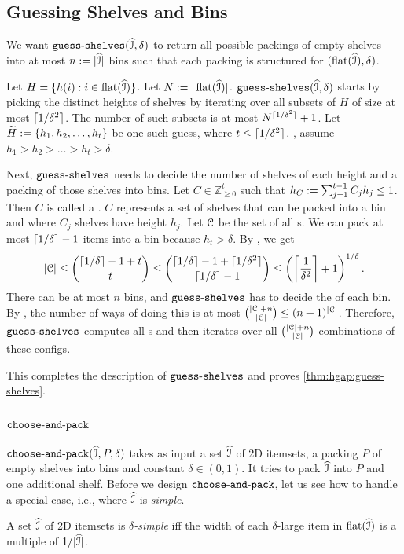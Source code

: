 \subsection{Guessing Shelves and Bins}
\label{sec:hgap:guess-shelves}

We want $\operatorname{\mathtt{guess-shelves}}(\widehat{\mathcal{I}}, \delta)$ to return all possible packings
of empty shelves into at most $n := |\widehat{\mathcal{I}}|$ bins such that
each packing is structured for $(\operatorname{flat}(\widehat{\mathcal{I}}), \delta)$.

Let $H = \{h(i): i \in \operatorname{flat}(\widehat{\mathcal{I}})\}$. Let $N := |\operatorname{flat}(\widehat{\mathcal{I}})|$.
$\operatorname{\mathtt{guess-shelves}}(\widehat{\mathcal{I}}, \delta)$ starts by picking the distinct heights of shelves
by iterating over all subsets of $H$ of size at most $\lceil 1/\delta^2 \rceil$.
The number of such subsets is at most $N^{\lceil 1/\delta^2 \rceil}+1$.
Let $\widetilde{H} := \{h_1, h_2, \ldots, h_t\}$ be one such guess, where $t \le \lceil 1/\delta^2 \rceil$.
\WLoG, assume $h_1 > h_2 > \ldots > h_t > \delta$.

Next, $\operatorname{\mathtt{guess-shelves}}$ needs to decide the number of shelves of each height
and a packing of those shelves into bins.
Let $C \in \mathbb{Z}_{\ge 0}^t$ such that $h_C := \sum_{j=1}^{t-1} C_jh_j \le 1$.
Then $C$ is called a \config{}.
$C$ represents a set of shelves that can be packed into a bin
and where $C_j$ shelves have height $h_j$.
Let $\mathcal{C}$ be the set of all \config{}s.
We can pack at most $\left\lceil 1/\delta \right\rceil-1$ items into a bin because $h_t > \delta$.
By , we get
\[ |\mathcal{C}| \le \binom{\left\lceil 1/\delta \right\rceil-1+t}{t}
\le \binom{\left\lceil 1/\delta \right\rceil-1+\lceil 1/\delta^2 \rceil}{\left\lceil 1/\delta \right\rceil-1}
\le \left(\left\lceil \frac{1}{\delta^2} \right\rceil+1\right)^{1/\delta}. \]
There can be at most $n$ bins, and $\operatorname{\mathtt{guess-shelves}}$ has to decide the \config{} of each bin.
By ,
the number of ways of doing this is at most
$\binom{|\mathcal{C}|+n}{|\mathcal{C}|} \le (n+1)^{|\mathcal{C}|}$.
Therefore, $\operatorname{\mathtt{guess-shelves}}$ computes all \config{}s and then
iterates over all $\binom{|\mathcal{C}|+n}{|\mathcal{C}|}$ combinations of these configs.

This completes the description of $\operatorname{\mathtt{guess-shelves}}$ and proves
\cref{thm:hgap:guess-shelves}.

\subsection{\texorpdfstring{$\operatorname{\mathtt{choose-and-pack}}$}{choose-and-pack}}
\label{sec:hgap:choose-and-pack}

$\operatorname{\mathtt{choose-and-pack}}(\widehat{\mathcal{I}}, P, \delta)$ takes as input a set $\widehat{\mathcal{I}}$ of 2D itemsets,
a packing $P$ of empty shelves into bins and constant $\delta \in (0, 1)$.
It tries to pack $\widehat{\mathcal{I}}$ into $P$ and one additional shelf.
Before we design $\operatorname{\mathtt{choose-and-pack}}$, let us see how to handle a special case,
i.e., where $\widehat{\mathcal{I}}$ is \emph{simple}.
\begin{definition}
A set $\widehat{\mathcal{I}}$ of 2D itemsets is \emph{$\delta$-simple} iff
the width of each $\delta$-large item in $\operatorname{flat}(\widehat{\mathcal{I}})$
is a multiple of $1/|\widehat{\mathcal{I}}|$.
\end{definition}

